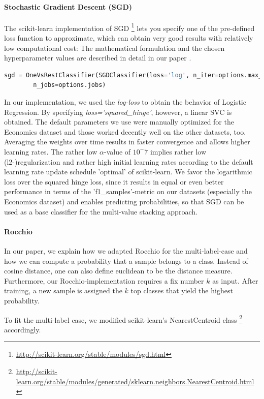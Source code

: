 \documentclass{article}
\begin{document}
\paragraph{Stochastic Gradient Descent (SGD)}
The scikit-learn implementation of SGD \footnote{\url{http://scikit-learn.org/stable/modules/sgd.html}} lets you specify one of the pre-defined loss function to approximate,
which can obtain very good results with relatively low computational cost:
The mathematical formulation and the chosen hyperparameter values are described in detail in our paper \cite{quadflor}.
\begin{lstlisting}[language=Python]
sgd = OneVsRestClassifier(SGDClassifier(loss='log', n_iter=options.max_iterations, penalty=options.penalty, alpha=options.alpha, average=True),
        n_jobs=options.jobs)
\end{lstlisting}
In our implementation, we used the \emph{log-loss} to obtain the behavior of
Logistic Regression. By specifying \emph{loss='squared\_hinge'}, however, a linear SVC
is obtained. The default parameters we use were manually optimized for the Economics dataset and those
worked decently well on the other datasets, too.
Averaging the weights over time results in faster convergence and allows higher learning rates.
The rather low $\alpha$-value of $10^-7$ implies rather low (l2-)regularization and rather high initial learning rates
according to the default learning rate update schedule 'optimal' of scikit-learn.
We favor the logarithmic loss over the squared hinge loss, since it results in equal or even better performance
in terms of the 'f1\_samples'-metric on our datasets (especially the Economics dataset) and enables predicting probabilities,
so that SGD can be used as a base classifier for the multi-value stacking approach.

\paragraph{Rocchio}
In our paper, we explain how we adapted Rocchio for the multi-label-case and how we can compute a probability that a sample
belongs to a class. Instead of cosine distance, one can also define euclidean to be the distance measure.
Furthermore, our Rocchio-implementation requires a fix number $k$ as input. After training, a new sample is assigned
the $k$ top classes that yield the highest probability.

To fit the multi-label case, we modified scikit-learn's NearestCentroid class
\footnote{\url{http://scikit-learn.org/stable/modules/generated/sklearn.neighbors.NearestCentroid.html}} accordingly.
\end{document}
